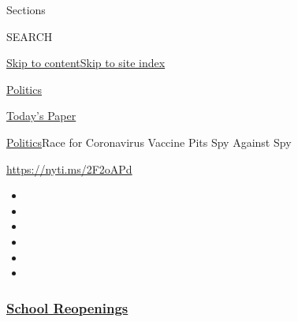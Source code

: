 Sections

SEARCH

\protect\hyperlink{site-content}{Skip to
content}\protect\hyperlink{site-index}{Skip to site index}

\href{https://www.nytimes3xbfgragh.onion/section/politics}{Politics}

\href{https://myaccount.nytimes3xbfgragh.onion/auth/login?response_type=cookie\&client_id=vi}{}

\href{https://www.nytimes3xbfgragh.onion/section/todayspaper}{Today's
Paper}

\href{/section/politics}{Politics}\textbar{}Race for Coronavirus Vaccine
Pits Spy Against Spy

\url{https://nyti.ms/2F2oAPd}

\begin{itemize}
\item
\item
\item
\item
\item
\item
\end{itemize}

\hypertarget{school-reopenings}{%
\subsubsection{\texorpdfstring{\href{https://www.nytimes3xbfgragh.onion/spotlight/schools-reopening?name=styln-coronavirus-schools-reopening\&region=TOP_BANNER\&block=storyline_menu_recirc\&action=click\&pgtype=Article\&impression_id=1791e5a0-f27e-11ea-b383-c73395fd03d7\&variant=undefined}{School
Reopenings}}{School Reopenings}}\label{school-reopenings}}

